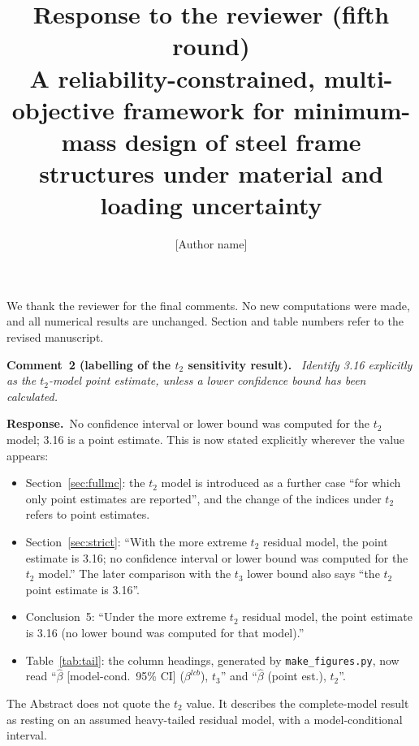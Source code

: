 \documentclass[11pt]{article}
\title{Response to the reviewer (fifth round)\\[0.3em]\large A reliability-constrained, multi-objective
framework for minimum-mass design of steel frame structures under material and loading uncertainty}
\author{[Author name]}
\date{}
\newenvironment{comment}[1]{\par\medskip\noindent\textbf{Comment~#1.}\ \itshape}{\par}
\newcommand{\resp}{\par\noindent\textbf{Response.}\ }
\begin{document}
\maketitle

We thank the reviewer for the final comments. No new computations were made, and all numerical
results are unchanged. Section and table numbers refer to the revised manuscript.

\begin{comment}{2 (labelling of the $t_2$ sensitivity result)}
Identify 3.16 explicitly as the $t_2$-model point estimate, unless a lower confidence bound has been
calculated.
\end{comment}
\resp No confidence interval or lower bound was computed for the $t_2$ model; 3.16 is a point
estimate. This is now stated explicitly wherever the value appears:
\begin{itemize}[itemsep=0.1em]
\item Section~\ref{sec:fullmc}: the $t_2$ model is introduced as a further case ``for which only point
estimates are reported'', and the change of the indices under $t_2$ refers to point estimates.
\item Section~\ref{sec:strict}: ``With the more extreme $t_2$ residual model, the point estimate is
3.16; no confidence interval or lower bound was computed for the $t_2$ model.'' The later comparison
with the $t_3$ lower bound also says ``the $t_2$ point estimate is 3.16''.
\item Conclusion~5: ``Under the more extreme $t_2$ residual model, the point estimate is 3.16 (no lower
bound was computed for that model).''
\item Table~\ref{tab:tail}: the column headings, generated by \texttt{make\_figures.py}, now read
``$\hat\beta$ [model-cond.\ 95\% CI] ($\beta^{lcb}$), $t_3$'' and ``$\hat\beta$ (point est.), $t_2$''.
\end{itemize}
The Abstract does not quote the $t_2$ value. It describes the complete-model result as resting on an
assumed heavy-tailed residual model, with a model-conditional interval.
\end{document}
